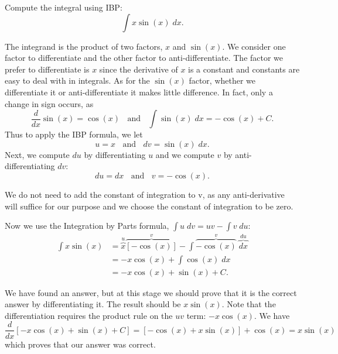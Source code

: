 \documentclass[handout]{ximera}
\begin{document}
\begin{example}[example 1] %
Compute the integral using IBP:
  \[
  \int x\sin(x) \;dx.
  \]
  
  The integrand is the product of two factors, $x$ and $\sin(x)$.  We consider one factor to differentiate and the other factor to anti-differentiate.
  The factor we prefer to differentiate is $x$ since the derivative of $x$ is a constant and constants are easy to deal with in integrals.
  As for the $\sin(x)$ factor, whether we differentiate it or anti-differentiate it makes little difference.  In fact, only a change in sign occurs,
  as 
  \[\frac{d}{dx}{\sin(x)} = \cos(x) \;\;  \text{    and    }\;\;   \int \sin(x) \;dx = -\cos(x) + C.\]
  Thus to apply the IBP formula, we let
  \[u=x \;\;\text{   and    }  \;\; dv = \sin(x) \;dx.\]
  Next, we compute $du$ by differentiating $u$ and we compute $v$ by anti-differentiating $dv$: 
  \[du = dx  \;\;  \text{    and    }\;\;    v = -\cos(x).\]
  \begin{remark} 
  We do not need to add the constant of integration to v, as any anti-derivative will suffice 
  for our purpose and we choose the constant of integration to be zero.
  \end{remark}
  Now we use the Integration by Parts formula, $\int u\;dv = uv-\int v\; du$:
  \begin{align*}
  \int x\sin(x) &= \overbrace{x}^{u}\overbrace{[-\cos(x)]}^{v} - \int \overbrace{-\cos(x)}^{v} \;\overbrace{dx}^{du}\\
                &= -x\cos(x) + \int \cos(x) \;dx\\
                &= -x\cos(x) + \sin(x) + C.
 \end{align*}
 
  We have found an answer, but at this stage we should prove that it is the correct answer by differentiating it.  The result should be $x\sin(x)$.
  Note that the differentiation requires the product rule on the $uv$ term: $-x\cos(x)$.
  We have
  \[
  \frac{d}{dx}{\left[-x\cos(x) + \sin(x) + C\right]} = [-\cos(x) + x\sin(x)] + \cos(x) = x\sin(x)
  \]
  which proves that our answer was correct.
  
    
\end{example}

\end{document}
